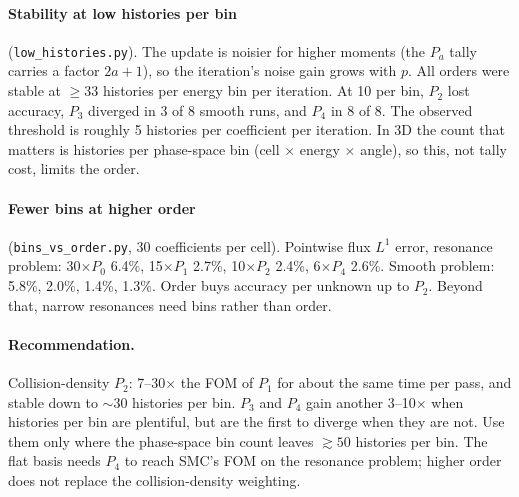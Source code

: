 \documentclass[11pt]{article}
\begin{document}
\paragraph{Stability at low histories per bin} (\texttt{low\_histories.py}). The update
is noisier for higher moments (the $P_a$ tally carries a factor $2a+1$), so the
iteration's noise gain grows with $p$. All orders were stable at $\ge 33$ histories per
energy bin per iteration. At 10 per bin, $P_2$ lost accuracy, $P_3$ diverged in 3 of 8
smooth runs, and $P_4$ in 8 of 8. The observed threshold is roughly 5 histories per
coefficient per iteration. In 3D the count that matters is histories per
phase-space bin (cell $\times$ energy $\times$ angle), so this, not tally cost, limits
the order.

\paragraph{Fewer bins at higher order} (\texttt{bins\_vs\_order.py}, 30 coefficients per
cell). Pointwise flux $L^1$ error, resonance problem: 30$\times P_0$ 6.4\%,
15$\times P_1$ 2.7\%, 10$\times P_2$ 2.4\%, 6$\times P_4$ 2.6\%. Smooth problem:
5.8\%, 2.0\%, 1.4\%, 1.3\%. Order buys accuracy per unknown up to $P_2$. Beyond that,
narrow resonances need bins rather than order.

\paragraph{Recommendation.} Collision-density $P_2$: 7--30$\times$ the FOM of $P_1$ for
about the same time per pass, and stable down to $\sim$30 histories per bin. $P_3$ and
$P_4$ gain another 3--10$\times$ when histories per bin are plentiful, but are the first
to diverge when they are not. Use them only where the phase-space bin count leaves
$\gtrsim 50$ histories per bin. The flat basis needs $P_4$ to reach SMC's FOM on the
resonance problem; higher order does not replace the collision-density weighting.
\end{document}
